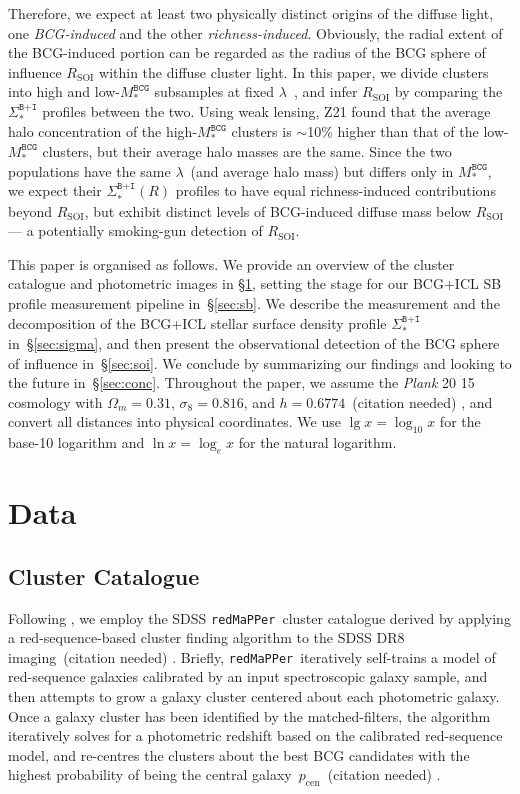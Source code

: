 \documentclass[fleqn,usenatbib]{mnras}
\newcommand{\rsoi}{R_{\mathrm{SOI}}}
\newcommand{\sigbi}{\Sigma_*^{\texttt{B+I}}}
\newcommand{\msbcg}{M_*^{\texttt{BCG}}}
\newcommand{\pcen}{p_{\mathrm{cen}}}
\newcommand\xkchen[1]{{\color{cyan} {#1}}}
\newcommand*\citeme{{\color{green}(citation needed)}}
\newcommand\redmapper{\texttt{redMaPPer}}
\begin{document}
Therefore, we expect at least two physically distinct origins of the
diffuse light, one {\it BCG-induced} and the other {\it richness-induced}.
Obviously, the radial extent of the BCG-induced portion can be regarded as
the radius of the BCG sphere of influence $\rsoi$ within the diffuse
cluster light. In this paper, we divide clusters into high and low-$\msbcg$
subsamples at fixed $\lambda$~\citep[see also][hereafter referred to as
]{Zu2021}, and infer $\rsoi$ by comparing the $\sigbi$
profiles between the two. Using weak lensing, Z21 found
that the average halo concentration of the high-$\msbcg$ clusters is $\sim$10\%
higher than that of the low-$\msbcg$ clusters, but their average halo
masses are the same. Since the two populations have the same $\lambda$~(and
average halo mass) but differs only in $\msbcg$, we expect their
$\sigbi(R)$ profiles to have equal richness-induced contributions beyond
$\rsoi$, but exhibit distinct levels of BCG-induced diffuse mass below
$\rsoi$ --- a potentially smoking-gun detection of $\rsoi$.


This paper is organised as follows. We provide an overview of the cluster
catalogue and photometric images in \S\ref{sec:data}, setting the stage for
our BCG+ICL SB profile measurement pipeline in~\S\ref{sec:sb}. We describe
the measurement and the decomposition of the BCG+ICL stellar surface
density profile $\sigbi$ in~\S\ref{sec:sigma}, and then present the
observational detection of the BCG sphere of influence in~\S\ref{sec:soi}.
We conclude by summarizing our findings and looking to the future
in~\S\ref{sec:conc}.  Throughout the paper, we assume the {\it Plank}
20\xkchen{15} cosmology with \xkchen{ $\Omega_m=0.31$, $\sigma_8=0.816$, and
$h=0.6774$}~\citeme \xkchen{\citep{PlanckCollaboration2016} }, and convert all distances into physical coordinates. We use $\lg x=\log_{10}x$ for the base-10 logarithm and $\ln x=\log_{e}x$ for
the natural logarithm.


\section{Data}
\label{sec:data}


\subsection{Cluster Catalogue}
\label{subsec:cls}


Following , we employ the SDSS \redmapper~cluster
catalogue derived by applying a red-sequence-based cluster finding
algorithm to the SDSS DR8 imaging~\citeme \xkchen{\citep{York2000, Aihara2011, Rykoff2014} }. Briefly, \redmapper~iteratively
self-trains a model of red-sequence galaxies calibrated by an input
spectroscopic galaxy sample, and then attempts to grow a galaxy cluster
centered about each photometric galaxy. Once a galaxy cluster has been
identified by the matched-filters, the algorithm iteratively solves for a
photometric redshift based on the calibrated red-sequence model, and
re-centres the clusters about the best BCG candidates with the highest
probability of being the central galaxy~$\pcen$~\citeme \xkchen{\citep{Rykoff2014} }.
\end{document}
